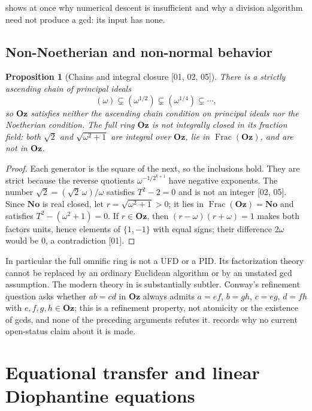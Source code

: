 \documentclass[11pt,oneside]{article}
\numberwithin{equation}{section}
\newtheorem{proposition}[proposition]{Proposition}
\theoremstyle{definition}
\theoremstyle{remark}
\newcommand{\No}{\mathbf{No}}
\newcommand{\Oz}{\mathbf{Oz}}
\newcommand{\Frac}{\operatorname{Frac}}
\newcommand{\src}[1]{\textup{\textsf{\small[#1]}}}
\begin{document}
 shows at once why numerical descent is insufficient and
why a division algorithm need not produce a gcd: its input has none.

\subsection{Non-Noetherian and non-normal behavior}

\begin{proposition}[Chains and integral closure \src{01, 02, 05}]\label{odg:prop:notnormal}
There is a strictly ascending chain of principal ideals
\[
 (\omega)\subsetneq(\omega^{1/2})\subsetneq
 (\omega^{1/4})\subsetneq\cdots,
\]
so $\Oz$ satisfies neither the ascending chain condition on principal
ideals nor the Noetherian condition. The full ring $\Oz$ is not integrally
closed in its fraction field: both $\sqrt2$ and $\sqrt{\omega^2+1}$ are
integral over $\Oz$, lie in $\Frac(\Oz)$, and are not in $\Oz$.
\end{proposition}
\begin{proof}
Each generator is the square of the next, so the inclusions hold. They are
strict because the reverse quotients $\omega^{-1/2^{k+1}}$ have negative
exponents. The number $\sqrt2=(\sqrt2\,\omega)/\omega$ satisfies $T^2-2=0$
and is not an integer \src{02, 05}. Since $\No$ is real closed, let
$r=\sqrt{\omega^2+1}>0$; it lies in $\Frac(\Oz)=\No$ and satisfies
$T^2-(\omega^2+1)=0$. If $r\in\Oz$, then $(r-\omega)(r+\omega)=1$ makes both
factors units, hence elements of $\{1,-1\}$ with equal signs; their difference
$2\omega$ would be $0$, a contradiction \src{01}.
\end{proof}

In particular the full omnific ring is not a UFD or a PID. Its factorization
theory cannot be replaced by an ordinary Euclidean algorithm or by an
unstated gcd assumption. The modern theory in \cite{LM} is substantially
subtler. Conway's refinement question asks whether $ab=cd$ in $\Oz$ always
admits $a=ef$, $b=gh$, $c=eg$, $d=fh$ with $e,f,g,h\in\Oz$; this is a
refinement property, not atomicity or the existence of gcds, and none of the
preceding arguments refutes it.  records why no current
open-status claim about it is made.

\section{Equational transfer and linear Diophantine equations}\label{odg:sec:transfer}
\end{document}
